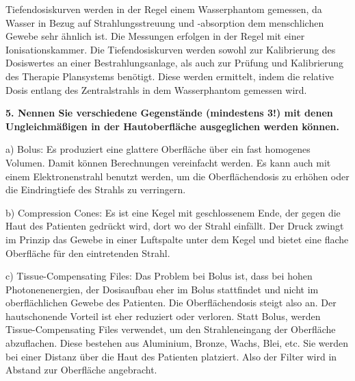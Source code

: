 Tiefendosiskurven werden in der Regel einem Wasserphantom gemessen, da Wasser in Bezug auf Strahlungsstreuung und -absorption dem menschlichen Gewebe sehr ähnlich ist. Die Messungen erfolgen in der Regel mit einer Ionisationskammer. Die Tiefendosiskurven werden sowohl zur Kalibrierung des Dosiswertes an einer Bestrahlungsanlage, als auch zur Prüfung und Kalibrierung des Therapie Plansystems benötigt. Diese werden ermittelt, indem die relative Dosis entlang des Zentralstrahls in dem Wasserphantom gemessen wird.

\textbf{5. Nennen Sie verschiedene Gegenstände (mindestens 3!) mit denen Ungleichmäßigen in der Hautoberfläche ausgeglichen werden können.}

a) Bolus: Es produziert eine glattere Oberfläche über ein fast homogenes Volumen. Damit können Berechnungen vereinfacht werden. Es kann auch mit einem Elektronenstrahl benutzt werden, um die Oberflächendosis zu erhöhen oder die Eindringtiefe des Strahls zu verringern.

b) Compression Cones: Es ist eine Kegel mit geschlossenem Ende, der gegen die Haut des Patienten gedrückt wird, dort wo der Strahl einfällt. Der Druck zwingt im Prinzip das Gewebe in einer Luftspalte unter dem Kegel und bietet eine flache Oberfläche für den eintretenden Strahl.

c) Tissue-Compensating Files: Das Problem bei Bolus ist, dass bei hohen Photonenenergien, der Dosisaufbau eher im Bolus stattfindet und nicht im oberflächlichen Gewebe des Patienten. Die Oberflächendosis steigt also an. Der hautschonende Vorteil ist eher reduziert oder verloren. Statt Bolus, werden Tissue-Compensating Files verwendet, um den Strahleneingang der Oberfläche abzuflachen. Diese bestehen aus Aluminium, Bronze, Wachs, Blei, etc. Sie werden bei einer Distanz über die Haut des Patienten platziert. Also der Filter wird in Abstand zur Oberfläche angebracht.

